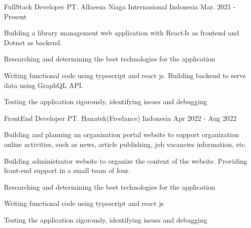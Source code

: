 

\begin{cventries}

  \cventry
    {FullStack Developer} %
    {PT. Alfaeeza Niaga Internasional} %
    {Indonesia} %
    {Mar. 2021 - Present} %
    {
      \begin{cvitems} %
        \item {Building a library management web application with ReactJs as frontend and Dotnet as backend.}
        \\
        \item {Researching and determining the best technologies for the application}
        \\
        \item {Writing functional code using typescript and react js. Building backend to serve data using GraphQL API.}
        \\
        \item {Testing the application rigorously, identifying issues and debugging}
      \end{cvitems}
    }

  \cventry
    {FrontEnd Developer} %
    {PT. Hanatek(Freelance)} %
    {Indonesia} %
    {Apr 2022 - Aug 2022} %
    {
      \begin{cvitems} %
        \item { Building and planning an organization portal website to support organization online activities, such as news, article publishing, job vacancies information, etc. }
        \\
        \item { Building administrator website to organize the content of the website. Providing front-end support in a small team of four. }
        \\
        \item{ Researching and determining the best technologies for the application}
        \\
        \item{ Writing functional code using typescript and react js}
        \\
        \item{ Testing the application rigorously, identifying issues and debugging }
      \end{cvitems}
    }


\end{cventries}
